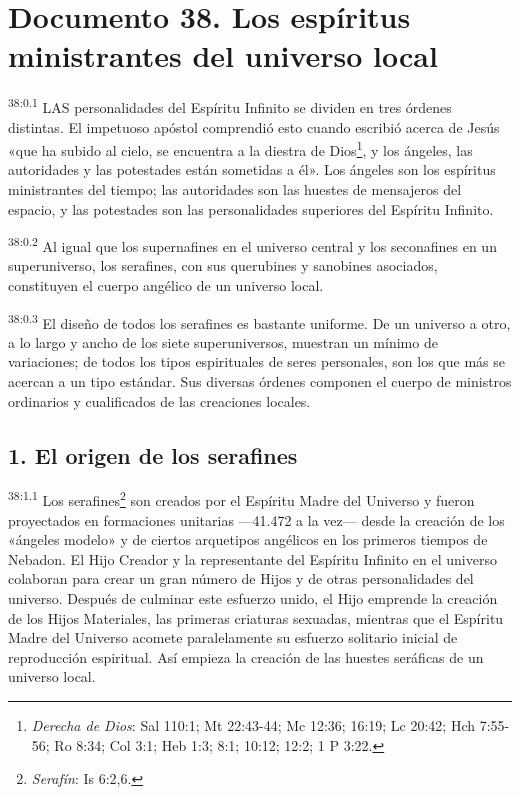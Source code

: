\chapter{Documento 38. Los espíritus ministrantes del universo local}
\par
\textsuperscript{38:0.1} LAS personalidades del Espíritu Infinito se dividen en tres órdenes distintas. El impetuoso apóstol comprendió esto cuando escribió acerca de Jesús «que ha subido al cielo, se encuentra a la diestra de Dios\footnote{\textit{Derecha de Dios}: Sal 110:1; Mt 22:43-44; Mc 12:36; 16:19; Lc 20:42; Hch 7:55-56; Ro 8:34; Col 3:1; Heb 1:3; 8:1; 10:12; 12:2; 1 P 3:22.}, y los ángeles, las autoridades y las potestades están sometidas a él». Los ángeles son los espíritus ministrantes del tiempo; las autoridades son las huestes de mensajeros del espacio, y las potestades son las personalidades superiores del Espíritu Infinito.

\par
\textsuperscript{38:0.2} Al igual que los supernafines en el universo central y los seconafines en un superuniverso, los serafines, con sus querubines y sanobines asociados, constituyen el cuerpo angélico de un universo local.

\par
\textsuperscript{38:0.3} El diseño de todos los serafines es bastante uniforme. De un universo a otro, a lo largo y ancho de los siete superuniversos, muestran un mínimo de variaciones; de todos los tipos espirituales de seres personales, son los que más se acercan a un tipo estándar. Sus diversas órdenes componen el cuerpo de ministros ordinarios y cualificados de las creaciones locales.

\section*{1. El origen de los serafines}
\par
\textsuperscript{38:1.1} Los serafines\footnote{\textit{Serafín}: Is 6:2,6.} son creados por el Espíritu Madre del Universo y fueron proyectados en formaciones unitarias ---41.472 a la vez--- desde la creación de los «ángeles modelo» y de ciertos arquetipos angélicos en los primeros tiempos de Nebadon. El Hijo Creador y la representante del Espíritu Infinito en el universo colaboran para crear un gran número de Hijos y de otras personalidades del universo. Después de culminar este esfuerzo unido, el Hijo emprende la creación de los Hijos Materiales, las primeras criaturas sexuadas, mientras que el Espíritu Madre del Universo acomete paralelamente su esfuerzo solitario inicial de reproducción espiritual. Así empieza la creación de las huestes seráficas de un universo local.

